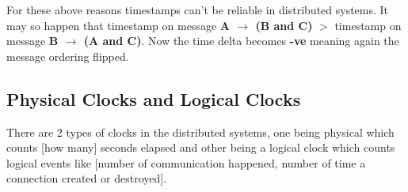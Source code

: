 \noindent For these above reasons timestamps can't be reliable in distributed systems. It may so happen that timestamp on message \textbf{A $\to$ (B and C)} $>$ timestamp on message \textbf{B $\to$ (A and C)}. Now the time delta becomes \textbf{-ve} meaning again the message ordering flipped.

\subsection{Physical Clocks and Logical Clocks}
There are 2 types of clocks in the distributed systems, one being physical which counts [how many] seconds elapsed and other being a logical clock which counts logical events like [number of communication happened, number of time a connection created or destroyed].